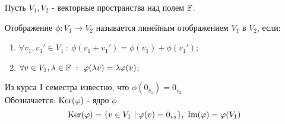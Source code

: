     Пусть $V_1, V_2$ - векторные пространства над полем $\F$.
    \begin{definition}
        Отображение $\phi: V_1 \rightarrow V_2$ называется линейным отображением $V_1$ в $V_2$, если:
        \begin{enumerate}
            \item $\forall v_1, v_1'\in V_1 \ : \ \phi(v_1 + v_1') = \phi(v_1) + \phi(v_1')$;
            \item $\forall v \in V_1, \lambda \in \F \ : \ \phi(\lambda v) = \lambda\phi(v)$;
        \end{enumerate}
        Из курса $\textup{I}$ семестра известно, что $\phi (0_{v_1}) = 0_{v_2}$  \\
        Обозначается: $\textup{Ker}(\phi)$ - ядро $\phi$
        $$\textup{Ker}(\phi) = \{v \in V_1 \ | \ \phi(v) = 0_{v_2}\}, \ \text{Im}(\phi) = \phi(V_1)$$ 
    \end{definition}

